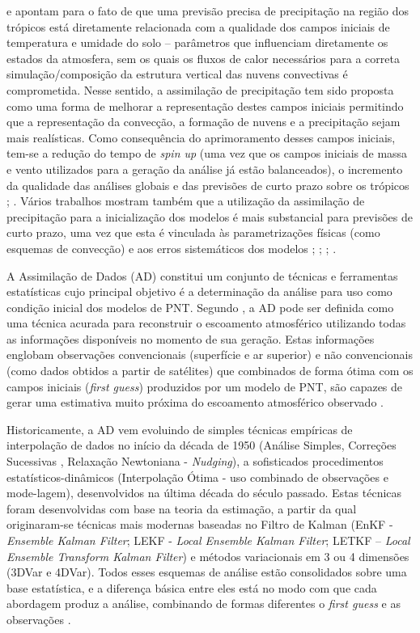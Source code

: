  e  apontam para o fato de que uma previsão precisa de precipitação na região dos trópicos está diretamente relacionada com a qualidade dos campos iniciais de temperatura e umidade do solo – parâmetros que influenciam diretamente os estados da atmosfera, sem os quais os fluxos de calor necessários para a correta simulação/composição da estrutura vertical das nuvens convectivas é comprometida. Nesse sentido, a assimilação de precipitação tem sido proposta como uma forma de melhorar a representação destes campos iniciais permitindo que a representação da convecção, a formação de nuvens e a precipitação sejam mais realísticas. Como consequência do aprimoramento desses campos iniciais, tem-se a redução do tempo de \textit{spin up} (uma vez que os campos iniciais de massa e vento utilizados para a geração da análise já estão balanceados), o incremento da qualidade das análises globais e das previsões de curto prazo sobre os trópicos \cite{heckleyetal90}; \cite{falkovichetal00}. Vários trabalhos mostram também que a utilização da assimilação de precipitação para a inicialização dos modelos é mais substancial para previsões de curto prazo, uma vez que esta é vinculada às parametrizações físicas (como esquemas de convecção) e aos erros sistemáticos dos modelos \cite{kasaharaetal94}; \cite{mathur95}; \cite{zupanskimesinger95}; \cite{nunescocke04}.

A Assimilação de Dados (AD) constitui um conjunto de técnicas e ferramentas estatísticas cujo principal objetivo é a determinação da análise para uso como condição inicial dos modelos de PNT. Segundo , a AD pode ser definida como uma técnica acurada para reconstruir o escoamento atmosférico utilizando todas as informações disponíveis no momento de sua geração. Estas informações englobam observações convencionais (superfície e ar superior) e não convencionais (como dados obtidos a partir de satélites) que combinados de forma ótima com os campos iniciais (\textit{first guess}) produzidos por um modelo de PNT, são capazes de gerar uma estimativa muito próxima do escoamento atmosférico observado \cite{kalnay03}.

Historicamente, a AD vem evoluindo de simples técnicas empíricas de interpolação de dados no início da década de 1950 (Análise Simples, Correções Sucessivas \cite{cressman59}, Relaxação Newtoniana - \textit{Nudging}), a sofisticados procedimentos estatísticos-dinâmicos (Interpolação Ótima - uso combinado de observações e mode-lagem), desenvolvidos na última década do século passado. Estas técnicas foram desenvolvidas com base na teoria da estimação, a partir da qual originaram-se técnicas mais modernas baseadas no Filtro de Kalman (EnKF - \textit{Ensemble Kalman Filter}; LEKF - \textit{Local Ensemble Kalman Filter}; LETKF – \textit{Local Ensemble Transform Kalman Filter}) e métodos variacionais em 3 ou 4 dimensões (3DVar e 4DVar). Todos esses esquemas de análise estão consolidados sobre uma base estatística, e a diferença básica entre eles está no modo com que cada abordagem produz a análise, combinando de formas diferentes o \textit{first guess} e as observações \cite{kalnay03}.

